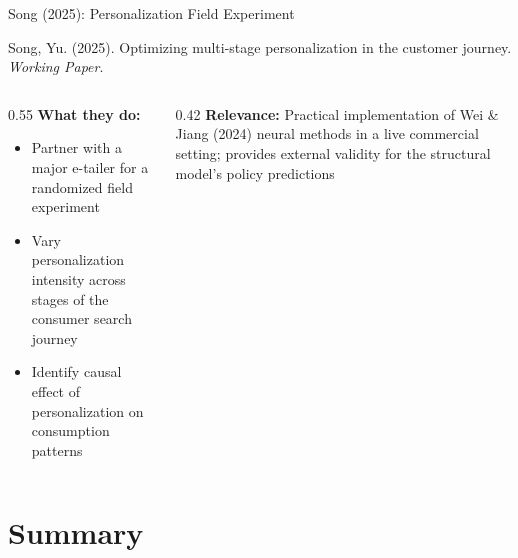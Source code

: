\documentclass[aspectratio=169,professionalfonts]{beamer}
\newcommand{\hl}[1]{\textbf{\textcolor{UGARed}{#1}}}
\begin{document}
\begin{frame}{Song (2025): Personalization Field Experiment}
  \begin{tcolorbox}[colback=red!5!white, colframe=UGARed, title=\textbf{Citation}]
    Song, Yu. (2025). Optimizing multi-stage personalization in the customer journey.
    \textit{Working Paper}.
  \end{tcolorbox}
  \vspace{6pt}
  \begin{columns}[T]
    \begin{column}{0.55\textwidth}
      \hl{What they do:}
      \begin{itemize}
        \item Partner with a major e-tailer for a randomized field experiment
        \item Vary personalization intensity across stages of the consumer search journey
        \item Identify causal effect of personalization on consumption patterns
      \end{itemize}
    \end{column}
    \begin{column}{0.42\textwidth}
      \hl{Relevance:} Practical implementation of Wei \& Jiang (2024) neural methods in
      a live commercial setting; provides external validity for the structural model's
      policy predictions
    \end{column}
  \end{columns}
\end{frame}

\section{Summary}
\end{document}
